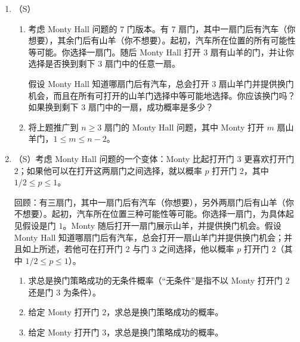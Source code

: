 \documentclass[UTF8,12pt,a4paper,fontset=fandol]{ctexart}
\begin{document}
\begin{enumerate}
  在这个假设下，例如我们知道
  \[
    P(W_1,W_2,W_3^c,W_4^c,\ldots,W_{100}^c|\text{垃圾邮件})
    =
    p_1p_2(1-p_3)(1-p_4)\cdots(1-p_{100}).
  \]
  如果没有朴素贝叶斯假设，就会有远为巨大的统计与计算困难，因为我们需要考虑 $2^{100}\approx 1.3\times 10^{30}$ 个形如
  \[
    A_1\cap A_2\cap\cdots\cap A_{100}
  \]
  的事件，其中每个 $A_j$ 等于 $W_j$ 或 $W_j^c$。现在一封新邮件到达，它包含列表中第 $23,64,65$ 个词或短语（但不包含其他 $97$ 个）。因此我们想计算
  \[
  P(\text{垃圾邮件}|W_1^c,\ldots,W_{22}^c,W_{23},
  W_{24}^c,\ldots,W_{63}^c,W_{64},W_{65},W_{66}^c,\ldots,W_{100}^c).
  \]
  注意，我们需要以\textit{所有}证据为条件，而不仅仅是 $W_{23}\cap W_{64}\cap W_{65}$ 已发生这一事实。求这封新邮件是垃圾邮件的条件概率（用 $p,p_j,r_j$ 表示）。

\subsection*{Monty Hall}

  \item （S）
  \begin{enumerate}
    \item 考虑 Monty Hall 问题的 $7$ 门版本。有 $7$ 扇门，其中一扇门后有汽车（你想要），其余门后有山羊（你不想要）。起初，汽车所在位置的所有可能性等可能。你选择一扇门。随后 Monty Hall 打开 $3$ 扇有山羊的门，并让你选择是否换到剩下 $3$ 扇门中的任意一扇。

    假设 Monty Hall 知道哪扇门后有汽车，总会打开 $3$ 扇山羊门并提供换门机会，而且在所有可打开的山羊门选择中等可能地选择。你应该换门吗？如果换到剩下 $3$ 扇门中的一扇，成功概率是多少？
    \item 将上题推广到 $n\ge 3$ 扇门的 Monty Hall 问题，其中 Monty 打开 $m$ 扇山羊门，$1\le m\le n-2$。
  \end{enumerate}

  \item （S）考虑 Monty Hall 问题的一个变体：Monty 比起打开门 $3$ 更喜欢打开门 $2$；如果他可以在打开这两扇门之间选择，就以概率 $p$ 打开门 $2$，其中 $1/2\le p\le 1$。

  回顾：有三扇门，其中一扇门后有汽车（你想要），另外两扇门后有山羊（你不想要）。起初，汽车所在位置三种可能性等可能。你选择一扇门，为具体起见假设是门 $1$。Monty 随后打开一扇门展示山羊，并提供换门机会。假设 Monty Hall 知道哪扇门后有汽车，总会打开一扇山羊门并提供换门机会；并且如上所述，若他可在打开门 $2$ 与门 $3$ 之间选择，他以概率 $p$ 打开门 $2$（其中 $1/2\le p\le 1$）。
  \begin{enumerate}
    \item 求总是换门策略成功的无条件概率（“无条件”是指不以 Monty 打开门 $2$ 还是门 $3$ 为条件）。
    \item 给定 Monty 打开门 $2$，求总是换门策略成功的概率。
    \item 给定 Monty 打开门 $3$，求总是换门策略成功的概率。
  \end{enumerate}


\end{enumerate}
\end{document}
